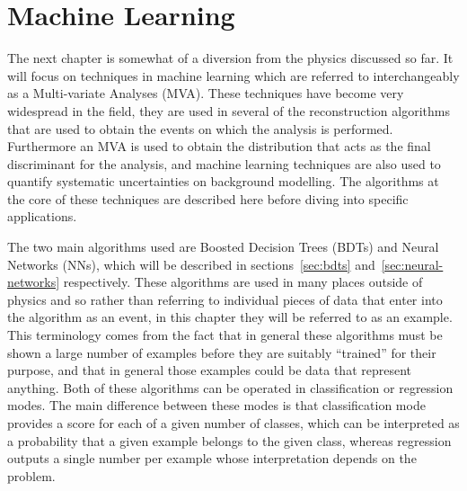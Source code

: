 \chapter{Machine Learning}%
\label{ch:ml}

The next chapter is somewhat of a diversion from the physics discussed so far.
It will focus on techniques in machine learning which are referred to
interchangeably as a Multi-variate Analyses (MVA). These techniques have become
very widespread in the field, they are used in several of the reconstruction
algorithms that are used to obtain the events on which the analysis is
performed. Furthermore an MVA is used to obtain the distribution that acts as
the final discriminant for the analysis, and machine learning techniques are
also used to quantify systematic uncertainties on background modelling. The
algorithms at the core of these techniques are described here before diving into
specific applications.

The two main algorithms used are Boosted Decision Trees (BDTs) and Neural
Networks (NNs), which will be described in sections~\ref{sec:bdts}
and~\ref{sec:neural-networks} respectively. These algorithms are used in many
places outside of physics and so rather than referring to individual pieces of
data that enter into the algorithm as an event, in this chapter they will be
referred to as an example. This terminology comes from the fact that in
general these algorithms must be shown a large number of examples before they
are suitably ``trained'' for their purpose, and that in general those examples
could be data that represent anything. Both of these algorithms can be operated
in classification or regression modes. The main difference between these modes
is that classification mode provides a score for each of a given number of
classes, which can be interpreted as a probability that a given example belongs
to the given class, whereas regression outputs a single number per example whose
interpretation depends on the problem.

